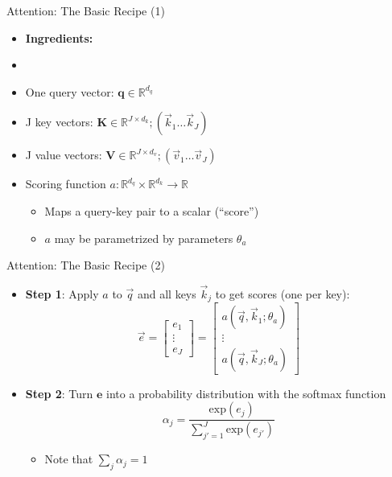 \begin{vbframe}{Attention: The Basic Recipe (1)}

\vfill

\begin{itemize}
	\item \textbf{Ingredients:}
	\item[]
	\item One query vector: $\mathbf{q} \in \mathbb{R}^{d_q}$
	\item J key vectors: $\mathbf{K} \in \mathbb{R}^{J \times d_k}; (\vec k_1 \ldots \vec k_J)$
	\item J value vectors: $\mathbf{V} \in \mathbb{R}^{J \times d_v}; (\vec v_1 \ldots \vec v_J)$
	\item Scoring function $a : \mathbb{R}^{d_q} \times \mathbb{R}^{d_k} \rightarrow \mathbb{R}$
		\begin{itemize}
			\item Maps a query-key pair to a scalar (``score'')
			\item $a$ may be parametrized by parameters $\theta_a$
		\end{itemize}
\end{itemize}

\vfill

\end{vbframe}

\begin{vbframe}{Attention: The Basic Recipe (2)}

\vfill

\begin{itemize}
	\item \textbf{Step 1}: Apply $a$ to $\vec q$ and all keys $\vec k_j$ to get scores (one per key): 
	$$\vec e = \begin{bmatrix} e_1 \\ \vdots \\ e_J \end{bmatrix} =  \begin{bmatrix} a(\vec q, \vec k_1; \theta_a) \\ \vdots \\ a(\vec q, \vec k_J; \theta_a) \end{bmatrix}$$
	\item \textbf{Step 2}: Turn $\mathbf{e}$ into a probability distribution with the softmax function
	$$\alpha_j = \frac{\mathrm{exp}(e_j)}{\sum_{j'=1}^J \mathrm{exp}(e_{j'})}$$
		\begin{itemize}
			\item Note that $\sum_j \alpha_j = 1$
		\end{itemize}
\end{itemize}

\vfill

\end{vbframe}

